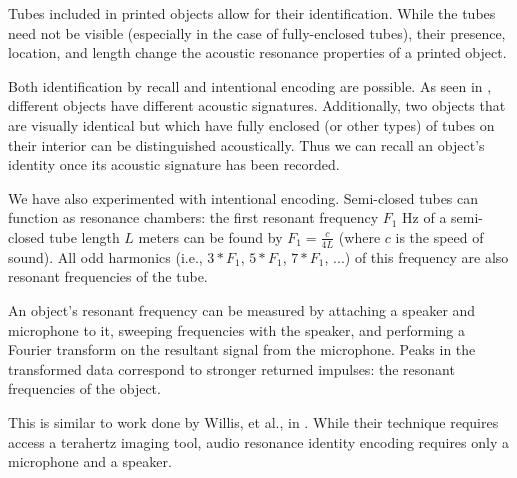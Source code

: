 Tubes included in printed objects allow for their identification.  While the tubes need not be visible (especially in the case of fully-enclosed tubes), their presence, location, and length change the acoustic resonance properties of a printed object.

Both identification by recall and intentional encoding are possible.  As seen in \cite{Ono-touchandactivate}, different objects have different acoustic signatures.  Additionally, two objects that are visually identical but which have fully enclosed (or other types) of tubes on their interior can be distinguished acoustically.  Thus we can recall an object's identity once its acoustic signature has been recorded.

We have also experimented with intentional encoding.  Semi-closed tubes can function as resonance chambers: the first resonant frequency $F_1$ Hz of a semi-closed tube length $L$ meters can be found by $F_1 = \frac{c}{4L}$ (where $c$ is the speed of sound).  All odd harmonics (i.e., $3*F_1$, $5*F_1$, $7*F_1$, ...) of this frequency are also resonant frequencies of the tube. 

An object's resonant frequency can be measured by attaching a speaker and microphone to it, sweeping frequencies with the speaker, and performing a Fourier transform on the resultant signal from the microphone.  Peaks in the transformed data correspond to stronger returned impulses: the resonant frequencies of the object.

This is similar to work done by Willis, et al., in \cite{Willis-infrastructs}.  While their technique requires access a terahertz imaging tool, audio resonance identity encoding requires only a microphone and a speaker.

